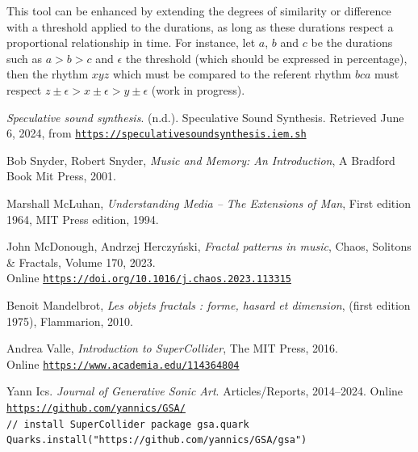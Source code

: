 \documentclass{article}
\begin{document}
This tool can be enhanced by extending the degrees of similarity or difference with a threshold applied to the durations, as long as these durations respect a proportional relationship in time. For instance, let $a$, $b$ and $c$ be the durations such as $a > b > c$ and $\epsilon$ the threshold (which should be expressed in percentage), then the rhythm $xyz$ which must be compared to the referent rhythm $bca$ must respect $z\pm\epsilon > x\pm\epsilon > y\pm\epsilon$ (work in progress).

\begin{thebibliography}{2}

	\textit{Speculative sound synthesis}. (n.d.). Speculative Sound Synthesis. Retrieved June 6, 2024, from
	\href{https://speculativesoundsynthesis.iem.sh}{\texttt{https://speculativesoundsynthesis.iem.sh}}


Bob Snyder, Robert Snyder,
\textit{Music and Memory: An Introduction},
A Bradford Book Mit Press, 2001.

Marshall McLuhan,
\textit{Understanding Media -- The Extensions of Man},
First edition 1964, MIT Press edition, 1994.

John McDonough, Andrzej Herczyński,
\textit{Fractal patterns in music},
Chaos, Solitons \& Fractals,
Volume 170,
2023. \\Online
\href{https://doi.org/10.1016/j.chaos.2023.113315}{\texttt{https://doi.org/10.1016/j.chaos.2023.113315}}

Benoit Mandelbrot,
\textit{Les objets fractals : forme, hasard et dimension}, (first edition 1975), Flammarion, 2010. 

Andrea Valle,
\textit{Introduction to SuperCollider},
The MIT Press, 2016. \\Online
\href{https://www.academia.edu/114364804}{\texttt{https://www.academia.edu/114364804}}

	Yann Ics. \textit{Journal of Generative Sonic Art}. Articles/Reports, 2014--2024. Online
	\href{https://github.com/yannics/GSA/}{\texttt{https://github.com/yannics/GSA/}}
	\smallskip \\ \texttt{\textcolor{sccomment}{// install SuperCollider package gsa.quark}
	\\ \textcolor{scclass}{Quarks}.install(\textcolor{sclink}{"https://github.com/yannics/GSA/gsa"})}

	

\end{thebibliography}
\end{document}
